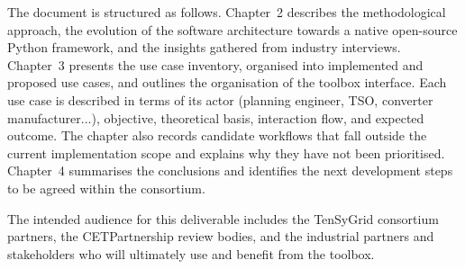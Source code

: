 The document is structured as follows. Chapter~2 describes the methodological approach, the evolution of the software architecture towards a native open-source Python framework, and the insights gathered from industry interviews. Chapter~3 presents the use case inventory, organised into implemented and proposed use cases, and outlines the organisation of the toolbox interface. Each use case is described in terms of its actor (planning engineer, TSO, converter manufacturer...), objective, theoretical basis, interaction flow, and expected outcome. The chapter also records candidate workflows that fall outside the current implementation scope and explains why they have not been prioritised. Chapter~4 summarises the conclusions and identifies the next development steps to be agreed within the consortium.

The intended audience for this deliverable includes the TenSyGrid consortium partners, the CETPartnership review bodies, and the industrial partners and stakeholders who will ultimately use and benefit from the toolbox.
